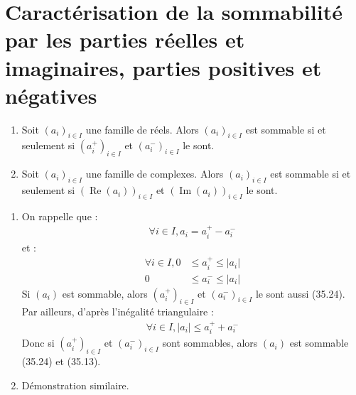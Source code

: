 \documentclass[../main.tex]{subfiles}
\begin{document}
\section{Caractérisation de la sommabilité par les parties réelles et imaginaires, parties positives et négatives}
\begin{tcolorbox}[title=Théorème 35.5, title filled=false, colframe=orange, colback=orange!10!white]
    \begin{enumerate}
        \item Soit $\left(a_i\right)_{i \in I}$ une famille de réels. Alors $\left(a_i\right)_{i \in I}$ est sommable si et seulement si $\left(a_i^{+}\right)_{i \in I}$ et $\left(a_i^{-}\right)_{i \in I}$ le sont. 
        \item Soit $\left(a_i\right)_{i \in I}$ une famille de complexes. Alors $\left(a_i\right)_{i \in I}$ est sommable si et seulement si $\left(\operatorname{Re}\left(a_i\right)\right)_{i \in I}$ et $\left(\operatorname{Im}\left(a_i\right)\right)_{i \in I}$ le sont.
    \end{enumerate}
\end{tcolorbox}

\begin{enumerate}
    \item On rappelle que : 
    \begin{align*}
        \forall i\in I, a_i = a_i^{+} - a_i^{-}
    \end{align*}
    et : 
    \begin{align*}
        \forall i\in I, 0&\leq a_i^+\leq |a_i| \\
        0&\leq a_i^- \leq |a_i|
    \end{align*}
    Si $(a_i)$ est sommable, alors $\left(a_i^{+}\right)_{i \in I}$ et $\left(a_i^{-}\right)_{i \in I}$ le sont aussi (35.24). \\
    Par ailleurs, d'après l'inégalité triangulaire : 
    \begin{align*}
        \forall i\in I, |a_i| \leq a_i^{+} + a_i^{-}
    \end{align*}
    Donc si $\left(a_i^{+}\right)_{i \in I}$ et $\left(a_i^{-}\right)_{i \in I}$ sont sommables, alors $(a_i)$ est sommable (35.24) et (35.13). 

    \item Démonstration similaire. 
\end{enumerate}

\end{document}
